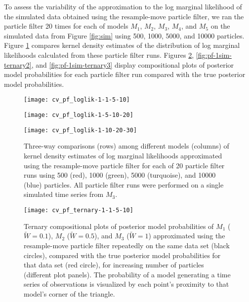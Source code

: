 \documentclass{article}
\begin{document}
To assess the variability of the approximation to the log marginal likelihood of the simulated data obtained using the resample-move particle filter, we ran the particle filter 20 times for each of models $M_1$, $M_2$, $M_3$, $M_4$, and $M_5$ on the simulated data from Figure \ref{fig:sim} using 500, 1000, 5000, and 10000 particles. Figure \ref{fig:pf-hist} compares kernel density estimates of the distribution of log marginal likelihoods calculated from these particle filter runs. Figures \ref{fig:pf-1sim-ternary1}, \ref{fig:pf-1sim-ternary2}, and \ref{fig:pf-1sim-ternary3} display compositional plots of posterior model probabilities for each particle filter run compared with the true posterior model probabilities.

\begin{figure}
\begin{minipage}{1.0\linewidth}
\texttt{[image: cv\_pf\_loglik-1-1-5-10]}
\end{minipage}
\begin{minipage}{1.0\linewidth}
\texttt{[image: cv\_pf\_loglik-1-5-10-20]}
\end{minipage}
\begin{minipage}{1.0\linewidth}
\texttt{[image: cv\_pf\_loglik-1-10-20-30]}
\end{minipage}
\caption{Three-way comparisons (rows) among different models (columns) of kernel density estimates of log marginal likelihoods approximated using the resample-move particle filter for each of 20 particle filter runs using 500 (red), 1000 (green), 5000 (turquoise), and 10000 (blue) particles. All particle filter runs were performed on a single simulated time series from $M_3$.} \label{fig:pf-hist}
\end{figure}

\begin{figure}
\texttt{[image: cv\_pf\_ternary-1-1-5-10]}
\caption{Ternary compositional plots of posterior model probabilities of $M_1$ ($\tilde{W} = 0.1$), $M_2$ ($\tilde{W} = 0.5$), and $M_3$ ($\tilde{W} = 1$) approximated using the resample-move particle filter repeatedly on the same data set (black circles), compared with the true posterior model probabilities for that data set (red circle), for increasing number of particles (different plot panels). The probability of a model generating a time series of observations is visualized by each point's proximity to that model's corner of the triangle.} \label{fig:pf-1sim-ternary1}
\end{figure}
\end{document}

